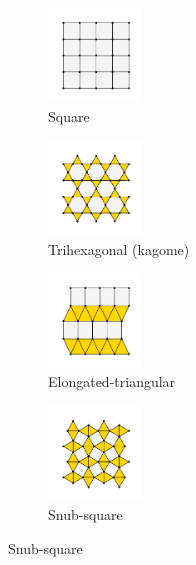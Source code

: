 \begin{figure}[bt]
     \centering
     
     \begin{subfigure}[b]{0.3\textwidth}
         \centering
         \includegraphics[height=2.5cm]{./figures/procrystals/sq.pdf}
         \caption{Square}
         \label{fig:symlatsq}
     \end{subfigure}
     \begin{subfigure}[b]{0.3\textwidth}
         \centering
         \includegraphics[height=2.5cm]{./figures/procrystals/trihex.pdf}
         \caption{Trihexagonal (kagome)}
         \label{fig:symlattrihex}
     \end{subfigure}
     \hfill
     
     \vspace{2mm}
     \begin{subfigure}[b]{0.3\textwidth}
         \centering
         \includegraphics[height=2.5cm]{./figures/procrystals/elongtri.pdf}
         \caption{Elongated\--triangular}
         \label{fig:symlatelong}
     \end{subfigure}
     \begin{subfigure}[b]{0.3\textwidth}
         \centering
         \includegraphics[height=2.5cm]{./figures/procrystals/snub.pdf}
         \caption{Snub\--square}
         \label{fig:symlatsnub}
     \end{subfigure}
     \hfill
     

\end{figure}
